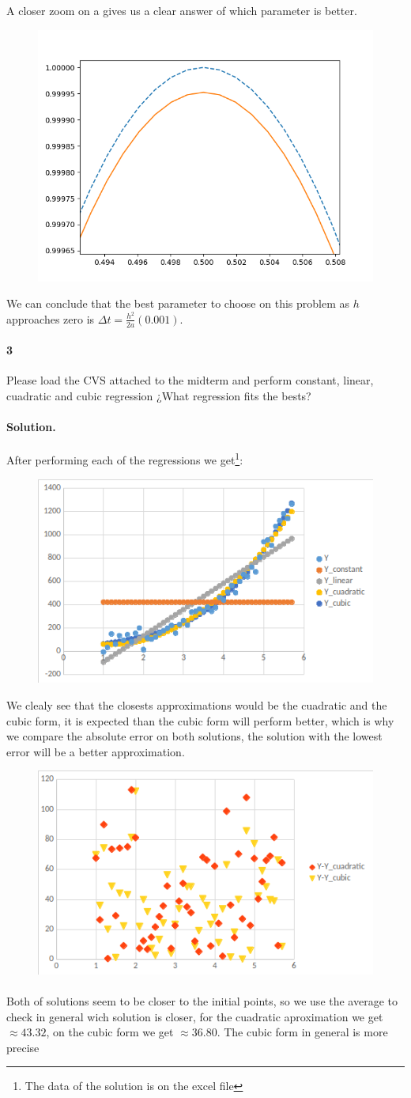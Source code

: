 \documentclass{article}
\begin{document}
A closer zoom on a gives us a clear answer of which parameter is better.\newline
\begin{figure}[h!]
	\centering
	\includegraphics[width=0.5\linewidth]{4.png}
\end{figure}
We can conclude that the best parameter to choose on this problem as $h$ approaches zero is $\Delta t = \frac{h^2}{2a}(0.001)$.
\paragraph{3} Please load the CVS attached to the midterm and perform constant, linear, cuadratic and cubic regression ¿What regression fits the bests?
\paragraph{Solution.} After performing each of the regressions we get\footnote{The data of the solution is on the excel file}:
\begin{figure}[h!]
	\centering
	\includegraphics[width=0.5\linewidth]{6.png}
\end{figure}
We clealy see that the closests approximations would be the cuadratic and the cubic form, it is expected than the cubic form will perform better, which is why we compare the absolute error on both solutions, the solution with the lowest error will be a better approximation.\newline
\begin{figure}[h!]
	\centering
	\includegraphics[width=0.5\linewidth]{7.png}
\end{figure}
\paragraph{} Both of solutions seem to be closer to the initial points, so we use the average to check in general wich solution is closer, for the cuadratic aproximation we get $\approx 43.32$, on the cubic form we get $\approx 36.80$. The cubic form in general is more precise
\end{document}
